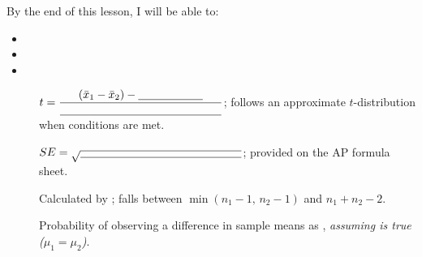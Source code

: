 \documentclass[10pt]{article}
\begin{document}
\namedateperiod

\vspace{0.12in}

\begin{objectivebox}
By the end of this lesson, I will be able to:
\begin{itemize}
  \item \writeline
  \item \writeline
  \item \writeline
\end{itemize}
\end{objectivebox}

\begin{vocabbox}
\begin{description}
  \item[]
        $t = \dfrac{(\bar x_1 - \bar x_2) - \blank{2cm}}{\blank{5cm}}$; follows an approximate
        $t$-distribution when conditions are met.
  \item[]
        $SE = \sqrt{\blank{5cm}}$; provided on the AP formula sheet.
  \item[]
        Calculated by \blank{4cm}; falls between $\min(n_1 - 1,\, n_2 - 1)$ and $n_1 + n_2 - 2$.
  \item[]
        Probability of observing a difference in sample means as \blank{6cm},
        \emph{assuming \blank{3cm} is true ($\mu_1 = \mu_2$)}.
\end{description}
\end{vocabbox}
\end{document}
